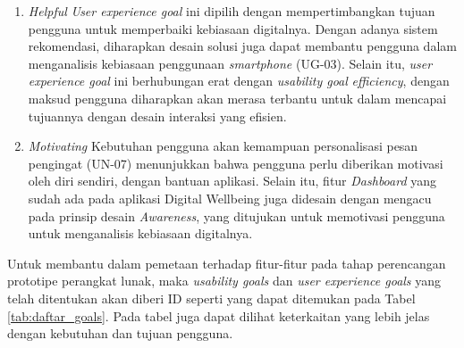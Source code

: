 \begin{enumerate}
  \item \textit{Helpful}
  \subitem \textit{User experience goal} ini dipilih dengan mempertimbangkan tujuan pengguna untuk memperbaiki kebiasaan digitalnya. Dengan adanya sistem rekomendasi, diharapkan desain solusi juga dapat membantu pengguna dalam menganalisis kebiasaan penggunaan \textit{smartphone} (UG-03). Selain itu, \textit{user experience goal} ini berhubungan erat dengan \textit{usability goal} \textit{efficiency}, dengan maksud pengguna diharapkan akan merasa terbantu untuk dalam mencapai tujuannya dengan desain interaksi yang efisien.

  \item \textit{Motivating}
  \subitem Kebutuhan pengguna akan kemampuan personalisasi pesan pengingat (UN-07) menunjukkan bahwa pengguna perlu diberikan motivasi oleh diri sendiri, dengan bantuan aplikasi. Selain itu, fitur \textit{Dashboard} yang sudah ada pada aplikasi Digital Wellbeing juga didesain dengan mengacu pada prinsip desain \textit{Awareness}, yang ditujukan untuk memotivasi pengguna untuk menganalisis kebiasaan digitalnya.

  
\end{enumerate}

Untuk membantu dalam pemetaan terhadap fitur-fitur pada tahap perencangan prototipe perangkat lunak, maka \textit{usability goals} dan \textit{user experience goals} yang telah ditentukan akan diberi ID seperti yang dapat ditemukan pada Tabel \ref{tab:daftar_goals}. Pada tabel juga dapat dilihat keterkaitan yang lebih jelas dengan kebutuhan dan tujuan pengguna.

